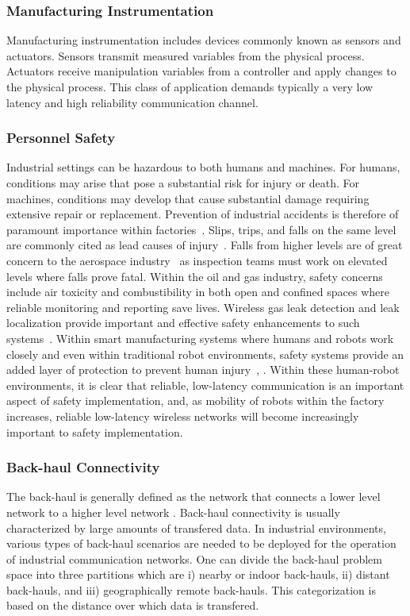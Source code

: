     \subsubsection{Manufacturing Instrumentation}  
    Manufacturing instrumentation includes devices commonly known as sensors and actuators.  Sensors transmit measured variables from the physical process.  Actuators receive manipulation variables from a controller and apply changes to the physical process. This class of application demands typically a very low latency and high reliability communication channel.  
    
    \subsubsection{Personnel Safety}  
    Industrial settings can be hazardous to both humans and machines.  For humans, conditions may arise that pose a substantial risk for injury or death.  For machines, conditions may develop that cause substantial damage requiring extensive repair or replacement.  Prevention of industrial accidents is therefore of paramount importance within factories~\cite{Smith201788}.  Slips, trips, and falls on the same level are commonly cited as lead causes of injury~\cite{Chang2016}. Falls from higher levels are of great concern to the aerospace industry~\cite{Candell2017IWW} as inspection teams must work on elevated levels where falls prove fatal.  Within the oil and gas industry, safety concerns include air toxicity and combustibility in both open and confined spaces where reliable monitoring and reporting save lives. Wireless gas leak detection and leak localization provide important and effective safety enhancements to such systems~\cite{Chraim2016}.  Within smart manufacturing systems where humans and robots work closely and even within traditional robot environments, safety systems provide an added layer of protection to prevent human injury~\cite{Huber:2017:DHI:3029798.3038346}, \cite{Zanchettin2016}.  Within these human-robot environments, it is clear that reliable, low-latency communication is an important aspect of safety implementation, and, as mobility of robots within the factory increases, reliable low-latency wireless networks will become increasingly important to safety implementation.
    
    \subsubsection{Back-haul Connectivity}  The back-haul is generally defined as the network that connects a lower level network to a higher level network \cite{7456186}. Back-haul connectivity is usually characterized by large amounts of transfered data. In industrial environments, various types of back-haul scenarios are needed to be deployed for the operation of industrial communication networks. One can divide the back-haul problem space into three partitions which are i) nearby or indoor back-hauls, ii) distant back-hauls, and iii) geographically remote back-hauls. This categorization is based on the distance over which data is transfered.
    
